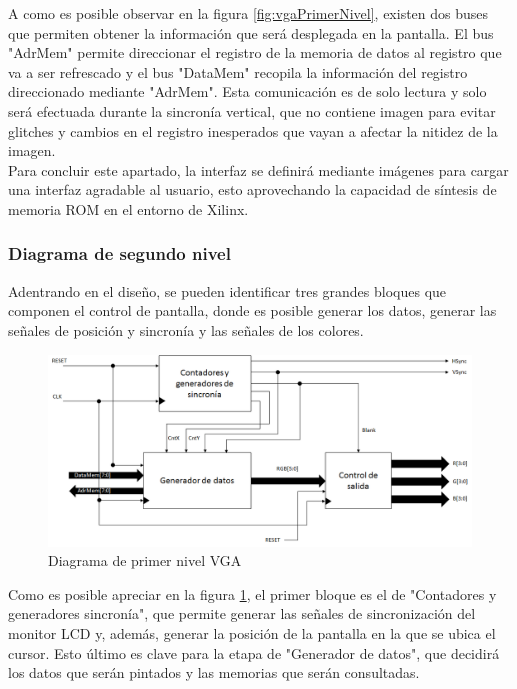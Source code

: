\documentclass[12pt,a4paper]{article}
\begin{document}
		A como es posible observar en la figura \ref{fig:vgaPrimerNivel}, existen dos buses que permiten obtener la información que será desplegada en la pantalla. El bus "AdrMem" permite direccionar el registro de la memoria de datos al registro que va a ser refrescado y el bus "DataMem" recopila la información del registro direccionado mediante "AdrMem". Esta comunicación es de solo lectura y solo será efectuada durante la sincronía vertical, que no contiene imagen para evitar glitches y cambios en el registro inesperados que vayan a afectar la nitidez de la imagen. \\[2ex]
		Para concluir este apartado, la interfaz se definirá mediante imágenes para cargar una interfaz agradable al usuario, esto aprovechando la capacidad de síntesis de memoria ROM en el entorno de Xilinx. \\[2ex]
		
		\subsubsection{Diagrama de segundo nivel} \label{sec:VGA_sn}
		Adentrando en el diseño, se pueden identificar tres grandes bloques que componen el control de pantalla, donde es posible generar los datos, generar las señales de posición y sincronía y las señales de los colores.
		
		\begin{figure}[hbtp]
			\centering
			\includegraphics[width=18cm]{img/VGASegundoNivel.png}
			\caption{Diagrama de primer nivel VGA}
			\label{fig:vgaSegundoNivel}
		\end{figure}
		
		Como es posible apreciar en la figura \ref{fig:vgaSegundoNivel}, el primer bloque es el de "Contadores y generadores sincronía", que permite generar las señales de sincronización del monitor LCD y, además, generar la posición de la pantalla en la que se ubica el cursor. Esto último es clave para la etapa de "Generador de datos", que decidirá los datos que serán pintados y las memorias que serán consultadas. \\[2ex]
		
\end{document}
